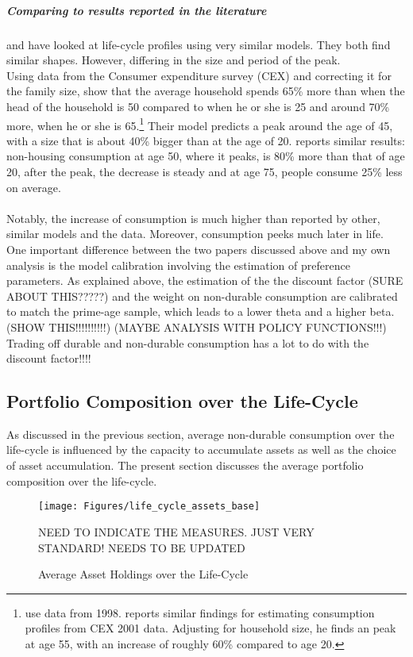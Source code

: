 \documentclass[a4paper,12pt,legno]{article}
\begin{document}
\subparagraph{Comparing to results reported in the literature} \cite{FV&K2011} and \cite{yang2009} have looked at life-cycle profiles using very similar models. They both find similar shapes. However, differing in the size and period of the peak.\\
Using data from the Consumer expenditure survey (CEX) and correcting it for the family size, \cite{FV&K2011} show that the average household spends 65\% more than when the head of the household is 50 compared to when he or she is 25 and around 70\% more, when he or she is 65.\footnote{\cite{FV&K2011} use data from 1998. \cite{yang2009} reports similar findings for estimating consumption profiles from CEX 2001 data. Adjusting for household size, he finds an peak at age 55, with an increase of roughly 60\% compared to age 20.} Their model predicts a peak around the age of 45, with a size that is about 40\% bigger than at the age of 20.  \cite{yang2009} reports similar results: non-housing consumption at age 50, where it peaks, is 80\% more than that of age 20, after the peak, the decrease is steady and at age 75, people consume 25\% less on average. \\ \\
Notably, the increase of consumption is much higher than reported by other, similar models and the data. Moreover, consumption peeks much later in life. One important difference between the two papers discussed above and my own analysis is the model calibration involving the estimation of preference parameters. As explained above, the estimation of the the discount factor (SURE ABOUT THIS?????) and the weight on non-durable consumption are calibrated to match the prime-age sample, which leads to a lower theta and a higher beta. (SHOW THIS!!!!!!!!!!) 
(MAYBE ANALYSIS WITH POLICY FUNCTIONS!!!) 
Trading off durable and non-durable consumption has a lot to do with the discount factor!!!! 

\subsection{Portfolio Composition over the Life-Cycle}
As discussed in the previous section, average non-durable consumption over the life-cycle is influenced by the capacity to accumulate assets as well as the choice of asset accumulation. The present section discusses the average portfolio composition over the life-cycle. 

\begin{figure}[!htbp]
\caption{Average Asset Holdings over the Life-Cycle} 
\label{asset_holdings_life_cycle}	%
\centering
\texttt{[image: Figures/life\_cycle\_assets\_base]}  %

\begin{minipage}{0.8\linewidth}
\footnotesize{NEED TO INDICATE THE MEASURES. JUST VERY STANDARD! NEEDS TO BE UPDATED}
\end{minipage}

\end{figure}
\end{document}
